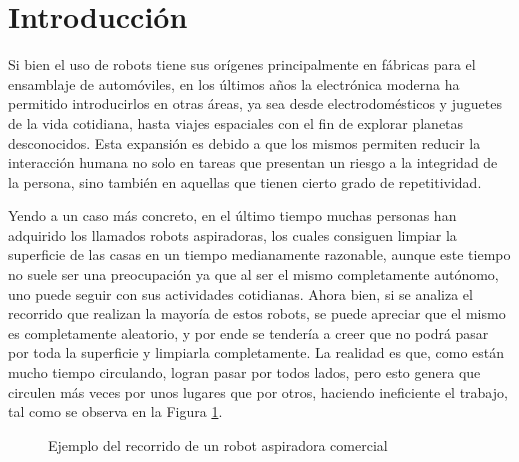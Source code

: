 \section{Introducción}
\label{sec:2_marcoteorico}
Si bien el uso de robots tiene sus orígenes principalmente en fábricas para el ensamblaje de automóviles, en los últimos años la electrónica moderna ha permitido introducirlos en otras áreas, ya sea desde electrodomésticos y juguetes de la vida cotidiana, hasta viajes espaciales con el fin de explorar planetas desconocidos. Esta expansión es debido a que los mismos permiten reducir la interacción humana no solo en tareas que presentan un riesgo a la integridad de la persona, sino también en aquellas que tienen cierto grado de repetitividad.

Yendo a un caso más concreto, en el último tiempo muchas personas han adquirido los llamados robots aspiradoras, los cuales consiguen limpiar la superficie de las casas en un tiempo medianamente razonable, aunque este tiempo no suele ser una preocupación ya que al ser el mismo completamente autónomo, uno puede seguir con sus actividades cotidianas. Ahora bien, si se analiza el recorrido que realizan la mayoría de estos robots, se puede apreciar que el mismo es completamente aleatorio, y por ende se tendería a creer que no podrá pasar por toda la superficie y limpiarla completamente. La realidad es que, como están mucho tiempo circulando, logran pasar por todos lados, pero esto genera que circulen más veces por unos lugares que por otros, haciendo ineficiente el trabajo, tal como se observa en la Figura \ref{fig:vaccumrobot}.

\begin{figure}%
    \centering
    \qquad
    \caption{Ejemplo del recorrido de un robot aspiradora comercial}
    \label{fig:vaccumrobot}
\end{figure}

